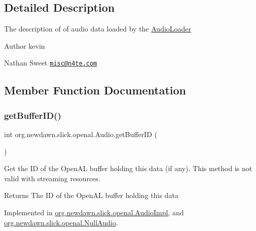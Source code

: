 \subsection{Detailed Description}
The description of of audio data loaded by the \mbox{\hyperlink{classorg_1_1newdawn_1_1slick_1_1openal_1_1_audio_loader}{Audio\+Loader}}

\begin{DoxyAuthor}{Author}
kevin 

Nathan Sweet \href{mailto:misc@n4te.com}{\tt misc@n4te.\+com} 
\end{DoxyAuthor}


\subsection{Member Function Documentation}
\mbox{\label{interfaceorg_1_1newdawn_1_1slick_1_1openal_1_1_audio_ac2a651989c7933bd896c7e0c382ba655}} 
\subsubsection{\texorpdfstring{get\+Buffer\+I\+D()}{getBufferID()}}
{\footnotesize\ttfamily int org.\+newdawn.\+slick.\+openal.\+Audio.\+get\+Buffer\+ID (\begin{DoxyParamCaption}{ }\end{DoxyParamCaption})}

Get the ID of the Open\+AL buffer holding this data (if any). This method is not valid with streaming resources.

\begin{DoxyReturn}{Returns}
The ID of the Open\+AL buffer holding this data 
\end{DoxyReturn}


Implemented in \mbox{\hyperlink{classorg_1_1newdawn_1_1slick_1_1openal_1_1_audio_impl_aaf5df57bc6269d59c5220fc89ef3800f}{org.\+newdawn.\+slick.\+openal.\+Audio\+Impl}}, and \mbox{\hyperlink{classorg_1_1newdawn_1_1slick_1_1openal_1_1_null_audio_a1451cb508be59521271ab423ea0785a7}{org.\+newdawn.\+slick.\+openal.\+Null\+Audio}}.

\mbox{\label{interfaceorg_1_1newdawn_1_1slick_1_1openal_1_1_audio_aa838b5606c0aa5f23dd46ac5918bb717}} 

